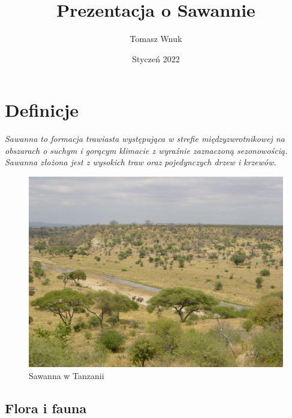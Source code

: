 \documentclass[14pt]{beamer}
\title{Prezentacja o Sawannie}
\author{Tomasz Wnuk}
\institute{Uniwersytet Marii Curie-Skłodowskiej}
\date{Styczeń 2022}
\begin{document}
\maketitle
\section{Definicje}

\begin{frame}{\color{black}{Co to jest sawanna?}}

    \begin{block}{\color{red}{O Sawannie}}
    \small  \textit{Sawanna to formacja trawiasta występująca w strefie międzyzwrotnikowej
    \small na obszarach o suchym i gorącym klimacie z wyraźnie zaznaczoną
    \small sezonowością. Sawanna złożona jest z wysokich traw oraz pojedynczych drzew i krzewów.}
    \end{block}
    
    \begin{figure}
        \centering
        \includegraphics[scale=0.1]{Sawanna_w_tanzanii.jpg}
        \caption{Sawanna w Tanzanii}
        \label{fig:my_label}
    \end{figure}
    
\end{frame}

\subsection{Flora i fauna}
\end{document}
